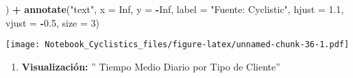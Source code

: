 \documentclass[
]{article}
\newenvironment{Shaded}{\begin{snugshade}}{\end{snugshade}}
\newcommand{\AttributeTok}[1]{\textcolor[rgb]{0.13,0.29,0.53}{#1}}
\newcommand{\ConstantTok}[1]{\textcolor[rgb]{0.56,0.35,0.01}{#1}}
\newcommand{\DecValTok}[1]{\textcolor[rgb]{0.00,0.00,0.81}{#1}}
\newcommand{\FloatTok}[1]{\textcolor[rgb]{0.00,0.00,0.81}{#1}}
\newcommand{\FunctionTok}[1]{\textcolor[rgb]{0.13,0.29,0.53}{\textbf{#1}}}
\newcommand{\NormalTok}[1]{#1}
\newcommand{\SpecialCharTok}[1]{\textcolor[rgb]{0.81,0.36,0.00}{\textbf{#1}}}
\newcommand{\StringTok}[1]{\textcolor[rgb]{0.31,0.60,0.02}{#1}}
\providecommand{\tightlist}{%
  \setlength{\itemsep}{0pt}\setlength{\parskip}{0pt}}
\begin{document}
\begin{Shaded}
\begin{Highlighting}[]
\NormalTok{    ) }\SpecialCharTok{+}
  \FunctionTok{annotate}\NormalTok{(}\StringTok{"text"}\NormalTok{, }\AttributeTok{x =} \ConstantTok{Inf}\NormalTok{, }\AttributeTok{y =} \SpecialCharTok{{-}}\ConstantTok{Inf}\NormalTok{, }\AttributeTok{label =} \StringTok{"Fuente: Cyclistic"}\NormalTok{, }\AttributeTok{hjust =} \FloatTok{1.1}\NormalTok{, }\AttributeTok{vjust =} \SpecialCharTok{{-}}\FloatTok{0.5}\NormalTok{, }\AttributeTok{size =} \DecValTok{3}\NormalTok{)}
\end{Highlighting}
\end{Shaded}

\texttt{[image: Notebook\_Cyclistics\_files/figure-latex/unnamed-chunk-36-1.pdf]}

\begin{enumerate}
\def\labelenumi{\arabic{enumi}.}
\setcounter{enumi}{2}
\tightlist
\item
  \textbf{Visualización:} '' Tiempo Medio Diario por Tipo de Cliente''
\end{enumerate}
\end{document}
